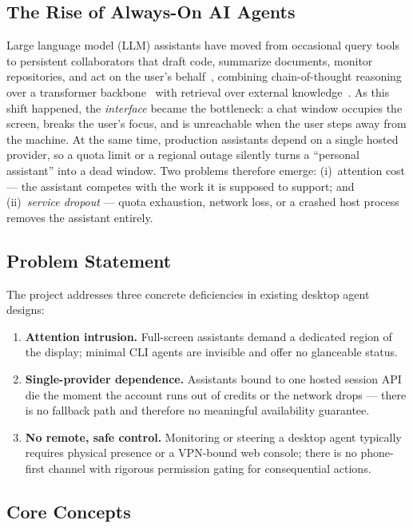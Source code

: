 \documentclass[conference]{IEEEtran}
\begin{document}
\subsection{The Rise of Always-On AI Agents}

Large language model (LLM) assistants have moved from
occasional query tools to persistent collaborators that draft
code, summarize documents, monitor repositories, and act on the
user's behalf~\cite{react,tooluse,llmsurvey}, combining
chain-of-thought reasoning~\cite{cot} over a transformer
backbone~\cite{transformer} with retrieval over external
knowledge~\cite{rag}. As this shift happened, the
\emph{interface} became the bottleneck: a chat window occupies
the screen, breaks the user's focus, and is unreachable when the
user steps away from the machine. At the same time, production
assistants depend on a single hosted provider, so a quota limit
or a regional outage silently turns a ``personal assistant'' into
a dead window. Two problems therefore emerge: (i)~attention cost
--- the assistant competes with the work it is supposed to
support; and (ii)~\emph{service dropout} --- quota exhaustion,
network loss, or a crashed host process removes the assistant
entirely.

\subsection{Problem Statement}

The project addresses three concrete deficiencies in existing
desktop agent designs:

\begin{enumerate}
  \item \textbf{Attention intrusion.} Full-screen assistants
  demand a dedicated region of the display; minimal CLI agents
  are invisible and offer no glanceable status.
  \item \textbf{Single-provider dependence.} Assistants bound to
  one hosted session API die the moment the account runs out of
  credits or the network drops --- there is no fallback path and
  therefore no meaningful availability guarantee.
  \item \textbf{No remote, safe control.} Monitoring or steering
  a desktop agent typically requires physical presence or a
  VPN-bound web console; there is no phone-first channel with
  rigorous permission gating for consequential actions.
\end{enumerate}

\subsection{Core Concepts}
\end{document}
